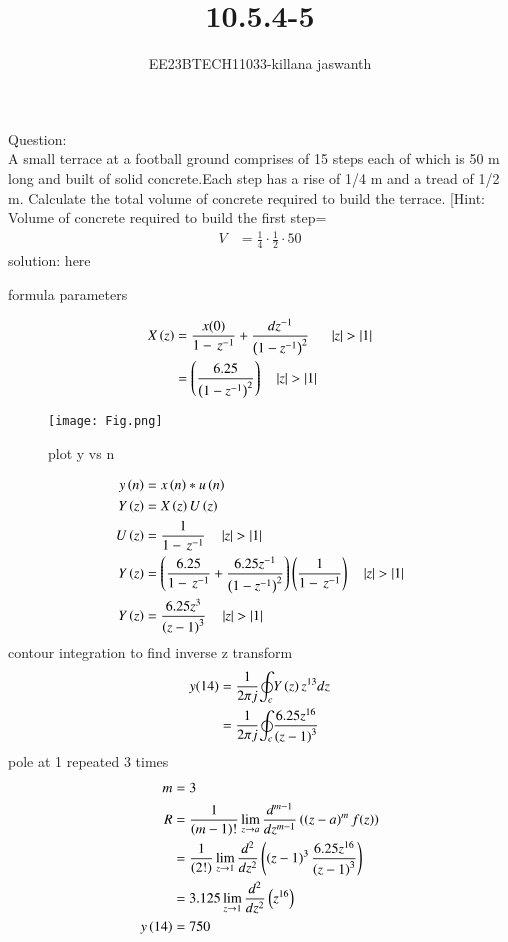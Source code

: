 \documentclass[journal,12pt,twocolumn]{IEEEtran}
\theoremstyle{remark}
\begin{document}

\vspace{3cm}

\title{10.5.4-5}
\author{EE23BTECH11033-killana jaswanth}
\maketitle
\newpage

\bigskip

\renewcommand{\thefigure}{\theenumi}
\renewcommand{\thetable}{\theenumi}
Question:\\
A small terrace at a football ground comprises of 15 steps each of which is 50
m long and built of solid concrete.Each step has a rise of 1/4 m and a tread of
1/2 m. Calculate the total volume of concrete required to build the terrace.
[Hint: Volume of concrete required to build the first step=\begin{align}
    V&=\frac{1}{4} \cdot \frac{1}{2} \cdot 50 
\end{align}
solution:
here\begin{table}[!ht]
 \centering
  
   \caption{formula parameters}
   \label{tab:10.5.4.5}
   \end{table}
\begin{align}
X\left(z\right)&=\frac{x(0)}{1-\,z^{-1}}+\frac{dz^{-1}}{\left(1-{z^{-1}}\right)^2}\:\:
\quad\left\vert z\right\vert>\left\vert1\right\vert\\
&=\left(\frac{6.25}{\left(1-z^{-1}\right)^2}\right) \quad\left\vert z\right\vert>\left\vert1\right\vert
\end{align}
\begin{figure}[!ht]
    \centering
    \texttt{[image: Fig.png]}
    \caption{plot y vs n}
    \label{fig:enter-label}
\end{figure}
\begin{align}
y\left(n\right)&=x\left(n\right)*u\left(n\right)\\
Y\left(z\right)&=X\left(z\right)U\left(z\right)\\
U\left(z\right)&=\frac{1}{1-\,z^{-1}}\quad\left\vert z\right\vert>\left\vert1\right\vert\\
Y\left(z\right)&=\left(\frac{6.25}{1-\,z^{-1}}+\frac{6.25z^{-1}}{\left(1-{z^{-1}}\right)^2}\right)\left(\frac{1}{1-\,z^{-1}}\right)\quad\left\vert z\right\vert>\left\vert1\right\vert\\
Y\left(z\right)&=\frac{6.25z^3}{\left(z-1\right)^{3}} \quad\left\vert z\right\vert>\left\vert1\right\vert
\end{align}
  contour integration to find inverse z transform
\begin{align}
y(14)&=\frac{1}{2{\pi}j}{\oint_c}Y\left(z\right)z^{13}dz\\
&=\frac{1}{2{\pi}j}{\oint_c}{\frac{6.25z^{16}}{\left(z-1\right)^{3}}}
\end{align}
pole at 1 repeated 3 times\\
\begin{align}
m&=3\\
R&=\frac{1}{\left(m-1\right)!}\lim_{z\to a}\frac{d^{m-1}}{dz^{m-1}}\left(\left(z-a\right)^mf{\left(z\right)}\right)\\
&=\frac{1}{\left(2!\right)}\lim_{z\to 1}\frac{d^2}{dz^2}\left(\left(z-1\right)^{3}\frac{6.25z^{16}}{\left(z-1\right)^3}\right)\\
&=3.125\lim_{z\to1}\frac{d^2}{dz^2}\left(z^{16}\right)\\
y\left(14\right)&=750
\end{align}
 
\end{document}
